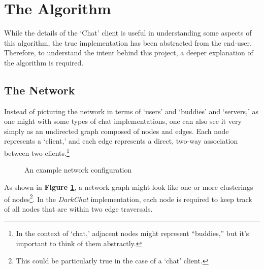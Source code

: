\documentclass[11pt]{article}
\begin{document}
\section{The Algorithm}

While the details of the `Chat' client is useful in understanding some aspects of this algorithm, the true implementation has been abstracted from the end-user. Therefore, to understand the intent behind this project, a deeper explanation of the algorithm is required.

\subsection{The Network}

Instead of picturing the network in terms of `users' and `buddies' and `servers,' as one might with some types of chat implementations, one can also see it very simply as an undirected graph composed of nodes and edges. Each node represents a `client,' and each edge represents a direct, two-way association between two clients.\footnote{In the context of `chat,' adjacent nodes might represent ``buddies,'' but it's important to think of them abstractly.}

\begin{figure}
  \caption{An example network configuration}
  \begin{center}
  \end{center}
\label{graph}
\end{figure}

As shown in {\bf Figure \ref{graph}}, a network graph might look like one or more clusterings of nodes\footnote{This could be particularly true in the case of a `chat' client.}. In the \emph{DarkChat} implementation, each node is required to keep track of all nodes that are within two edge traversals.
\end{document}
